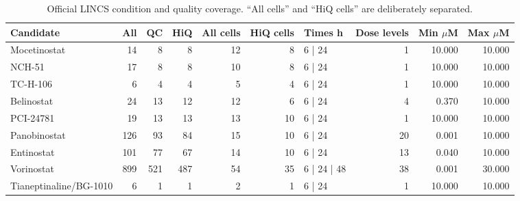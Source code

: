 \begingroup
\scriptsize
\begin{table}[H]
\centering
\caption{Official LINCS condition and quality coverage. ``All cells'' and ``HiQ cells'' are deliberately separated.}
\label{tab:s_coverage}
\begin{tabular}{@{}lrrrrrlrrr@{}}
\toprule
Candidate & All & QC & HiQ & All cells & HiQ cells & Times h & Dose levels & Min $\mu$M & Max $\mu$M \\
\midrule
Mocetinostat & 14 & 8 & 8 & 12 & 8 & 6 | 24 & 1 & 10.000 & 10.000 \\
NCH-51 & 17 & 8 & 8 & 10 & 8 & 6 | 24 & 1 & 10.000 & 10.000 \\
TC-H-106 & 6 & 4 & 4 & 5 & 4 & 6 | 24 & 1 & 10.000 & 10.000 \\
Belinostat & 24 & 13 & 12 & 12 & 6 & 6 | 24 & 4 & 0.370 & 10.000 \\
PCI-24781 & 19 & 13 & 13 & 13 & 10 & 6 | 24 & 1 & 10.000 & 10.000 \\
Panobinostat & 126 & 93 & 84 & 15 & 10 & 6 | 24 & 20 & 0.001 & 10.000 \\
Entinostat & 101 & 77 & 67 & 14 & 10 & 6 | 24 & 13 & 0.040 & 10.000 \\
Vorinostat & 899 & 521 & 487 & 54 & 35 & 6 | 24 | 48 & 38 & 0.001 & 30.000 \\
Tianeptinaline/BG-1010 & 6 & 1 & 1 & 2 & 1 & 6 | 24 & 1 & 10.000 & 10.000 \\
\bottomrule
\end{tabular}
\end{table}
\endgroup
